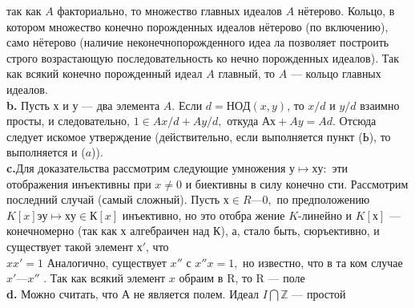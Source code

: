так как $A$ факториально, то множество главных идеалов $A$ нётерово.\linebreak
Кольцо, в котором множество конечно порожденных идеалов нётерово\linebreak
(по включению), само нётерово (наличие неконечнопорожденного идеа­\linebreak
ла позволяет построить строго возрастающую последовательность ко­\linebreak
нечно порожденных идеалов). Так как всякий конечно порожденный\linebreak
идеал $A$ главный, то $A$ --- кольцо главных идеалов.\\
\hspace*{15pt}\textbf{b.} Пусть $х$ и $у$ --- два элемента $A$. Если $d = НОД(x,y)$, то $x/d$\linebreak
и $y/d$ взаимно просты, и следовательно, $1 \in Ax/d + Ay/d,$ откуда\linebreak
$Ах + Ay = Ad$. Отсюда следует искомое утверждение (действительно,\linebreak
если выполняется пункт ($Ь$), то выполняется и ($a$)).\\
\hspace*{15pt}\textbf{c.}Для доказательства рассмотрим следующие умножения $у \mapsto ху:$\linebreak
эти отображения инъективны при $x \neq 0$ и биективны в силу конечно­\linebreak
сти. Рассмотрим последний случай (самый сложный). Пусть $х \in R —{0},$\linebreak
по предположению $K[x] э у \mapsto ху \in К[x]$ инъективно, но это отобра­\linebreak
жение $K$-линейно и $K[х]$ — конечномерно (так как х алгебраичен над\linebreak
К), а, стало быть, сюръективно, и существует такой элемент $х'$, что\\
\newpage
\noindent $xx' = 1 $ Аналогично, существует $x''$ с $x''x = 1,$ но известно, что в та­\linebreak
ком случае $x' — x''$ . Так как всякий элемент $x$ обраим в R, то R ---\linebreak
поле\\
\hspace*{15pt}\textbf{d.}  Можно считать, что А не является полем. Идеал $I\bigcap\mathbb{Z}$ — простой\linebreak

